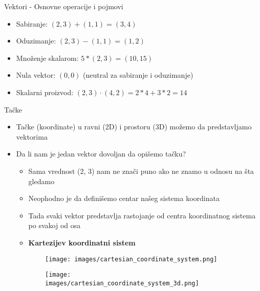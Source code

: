 \documentclass[bookmarks=true,bookmarksopen=true,pdfborder={0 0 0},pdfhighlight={/N},linkbordercolor={.5 .5 .5},implicit=false,unicode,xcolor={table}]{beamer}
\begin{document}
\begin{frame}{Vektori - Osnovne operacije i pojmovi}
  
  \begin{itemize}
    \item Sabiranje: $(2, 3) + (1, 1) = (3, 4)$
    \item Oduzimanje: $(2, 3) - (1, 1) = (1, 2)$
    \item Množenje skalarom: $5 * (2, 3) = (10, 15)$
    \item Nula vektor: $(0, 0)$ (neutral za sabiranje i oduzimanje)
    \item Skalarni proizvod: $(2, 3) \cdot (4, 2) = 2*4 + 3*2 = 14$
  \end{itemize}

\end{frame}

\begin{frame}{Tačke}

  \begin{itemize}
    \item Tačke (koordinate) u ravni (2D) i prostoru (3D) možemo da predstavljamo vektorima
    \item Da li nam je jedan vektor dovoljan da opišemo tačku?
    \begin{itemize}
      \item Sama vrednost (2, 3) nam ne znači puno ako ne znamo u odnosu na šta gledamo
      \item Neophodno je da definišemo centar našeg sistema koordinata
      \item Tada svaki vektor predstavlja rastojanje od centra koordinatnog sistema po svakoj od osa
      \item \textbf{Kartezijev koordinatni sistem}
    \end{itemize}
  \end{itemize}

  \begin{figure}
    \begin{subfigure}{4cm}
      \texttt{[image: images/cartesian\_coordinate\_system.png]}
    \end{subfigure}
    \begin{subfigure}{4cm}
      \texttt{[image: images/cartesian\_coordinate\_system\_3d.png]}
    \end{subfigure}
  \end{figure}

\end{frame}
\end{document}
